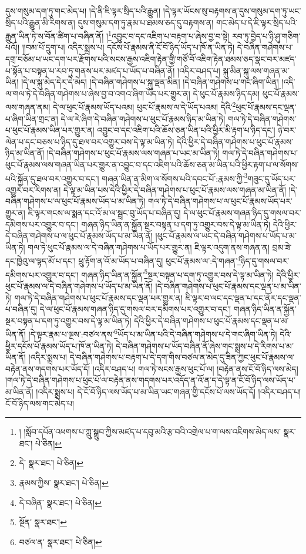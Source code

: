 དུས་གསུམ་དག་ཏུ་གང་མེད་པ། །དེ་ནི་ཇི་ལྟར་སྲིད་པའི་རྒྱུན། །དེ་ལྟར་ཡོངས་སུ་བརྟགས་ན་དུས་གསུམ་དག་ཏུ་ཡང་སྲིད་པའི་རྒྱུན་མི་རིགས་ན། དུས་གསུམ་དག་ཏུ་རྣམ་པ་ཐམས་ཅད་དུ་བརྟགས་ན། གང་མེད་པ་དེ་ཇི་ལྟར་སྲིད་པའི་རྒྱུན་ཡིན་ཏེ་ས་བོན་ཚིག་པ་བཞིན་ནོ། །\footnote{། །སློབ་དཔོན་འཕགས་པ་ཀླུ་སྒྲུབ་ཀྱིས་མཛད་པ་དབུ་མའི་རྩ་བའི་འགྲེལ་པ་ག་ལས་འཇིགས་མེད་ལས་  སྣར་ཐང་།  པེ་ཅིན། }འབྱུང་བ་དང་འཇིག་པ་བརྟག་པ་ཞེས་བྱ་བ་སྟེ། རབ་ཏུ་བྱེད་པ་ཉི་ཤུ་གཅིག་པའོ།། །།བམ་པོ་དྲུག་པ། འདིར་སྨྲས་པ། དངོས་པོ་རྣམས་ནི་ངོ་བོ་ཉིད་ཡོད་པ་ཁོ་ན་ཡིན་ཏེ། དེ་བཞིན་གཤེགས་པ་དགྲ་བཅོམ་པ་ཡང་དག་པར་རྫོགས་པའི་སངས་རྒྱས་འཇིག་རྟེན་གྱི་གཙོ་བོ་འཇིག་རྟེན་ཐམས་ཅད་སྣང་བར་མཛད་པ་སྟོན་པ་བསྟན་པ་རབ་ཏུ་གནས་པར་མཛད་པ་ཡོད་པ་བཞིན་ནོ། །འདིར་བཤད་པ། སྐུ་མིན་སྐུ་ལས་གཞན་མ་ཡིན། །དེ་ལ་སྐུ་མེད་དེར་དེ་མེད། །དེ་བཞིན་གཤེགས་པ་སྐུ་ལྡན་མིན། །དེ་བཞིན་གཤེགས་པ་གང་ཞིག་ཡིན། །འདི་ལ་གལ་ཏེ་དེ་བཞིན་གཤེགས་པ་ཞེས་བྱ་བ་འགའ་ཞིག་ཡོད་པར་གྱུར་ན། དེ་ཕུང་པོ་རྣམས་ཉིད་དམ། ཕུང་པོ་རྣམས་ལས་གཞན་ནམ། དེ་ལ་ཕུང་པོ་རྣམས་ཡོད་པའམ། ཕུང་པོ་རྣམས་ལ་དེ་ཡོད་པའམ། དེའི་\footnote{དེ་  སྣར་ཐང་།  པེ་ཅིན། }ཕུང་པོ་རྣམས་དང་ལྡན་པ་ཞིག་ཡིན་གྲང་ན། དེ་ལ་རེ་ཞིག་དེ་བཞིན་གཤེགས་པ་ཕུང་པོ་རྣམས་ཉིད་མ་ཡིན་ཏེ། གལ་ཏེ་དེ་བཞིན་གཤེགས་པ་ཕུང་པོ་རྣམས་ཡིན་པར་གྱུར་ན། འབྱུང་བ་དང་འཇིག་པའི་ཆོས་ཅན་ཡིན་པའི་ཕྱིར་མི་རྟག་པ་ཉིད་དང་། ཉེ་བར་ལེན་པ་དང་བཅས་པ་ཉིད་དུ་ཐལ་བར་འགྱུར་བས་དེ་ལྟ་མ་ཡིན་ཏེ། དེའི་ཕྱིར་དེ་བཞིན་གཤེགས་པ་ཕུང་པོ་རྣམས་ཉིད་མ་ཡིན་ནོ། །དེ་བཞིན་གཤེགས་པ་ཕུང་པོ་རྣམས་ལས་གཞན་པ་ཡང་མ་ཡིན་ཏེ། གལ་ཏེ་དེ་བཞིན་གཤེགས་པ་ཕུང་པོ་རྣམས་ལས་གཞན་ཡིན་པར་གྱུར་ན་འབྱུང་བ་དང་འཇིག་པའི་ཆོས་ཅན་མ་ཡིན་པའི་ཕྱིར་རྟག་པ་ལ་སོགས་པའི་སྐྱོན་དུ་ཐལ་བར་འགྱུར་བ་དང་། གཞན་ཡིན་ན་མིག་ལ་སོགས་པའི་དབང་པོ་:རྣམས་ཀྱི་\footnote{རྣམས་ཀྱིས་  སྣར་ཐང་།  པེ་ཅིན། }གཟུང་དུ་ཡོད་པར་འགྱུར་བར་རིགས་ན། དེ་ལྟ་མ་ཡིན་པས་དེའི་ཕྱིར་དེ་བཞིན་གཤེགས་པ་ཕུང་པོ་རྣམས་ལས་གཞན་མ་ཡིན་ནོ། །དེ་བཞིན་གཤེགས་པ་ལ་ཕུང་པོ་རྣམས་ཡོད་པ་མ་ཡིན་ཏེ། གལ་ཏེ་དེ་བཞིན་གཤེགས་པ་ལ་ཕུང་པོ་རྣམས་ཡོད་པར་གྱུར་ན། ཇི་ལྟར་གངས་ལ་སྨན་དང་འོ་མ་ལ་སྦྲང་བུ་ཡོད་པ་བཞིན་དུ། དེ་ལ་ཕུང་པོ་རྣམས་གཞན་ཉིད་དུ་གསལ་བར་དམིགས་པར་འགྱུར་བ་དང་། གཞན་ཉིད་ཡིན་ན་སྐྱོན་སྔར་བསྟན་པ་དག་ཏུ་འགྱུར་བས་དེ་ལྟ་མ་ཡིན་ཏེ། དེའི་ཕྱིར་དེ་བཞིན་གཤེགས་པ་ལ་ཕུང་པོ་རྣམས་ཡོད་པ་མ་ཡིན་ནོ། །ཕུང་པོ་རྣམས་ལ་ཡང་དེ་བཞིན་གཤེགས་པ་ཡོད་པ་མ་ཡིན་ཏེ། གལ་ཏེ་ཕུང་པོ་རྣམས་ལ་དེ་བཞིན་གཤེགས་པ་ཡོད་པར་གྱུར་ན། ཇི་ལྟར་འདུག་ནས་གཞན་ན། བྲམ་ཟེ་དང་ཁྱེའུ་ལ་ལྟད་མོ་པ་དང་། ཕྲུ་རྟོག་ན་འོ་མ་ཡོད་པ་བཞིན་དུ། ཕུང་པོ་རྣམས་ལ་:དེ་གཞན་\footnote{དེ་བཞིན་  སྣར་ཐང་།  པེ་ཅིན། }ཉིད་དུ་གསལ་བར་དམིགས་པར་འགྱུར་བ་དང་། གཞན་ཉིད་ཡིན་ན་སྐྱོན་\footnote{སྔོན་  སྣར་ཐང་། }སྔར་བསྟན་པ་དག་ཏུ་འགྱུར་བས་དེ་ལྟ་མ་ཡིན་ཏེ། དེའི་ཕྱིར་ཕུང་པོ་རྣམས་ལ་དེ་བཞིན་གཤེགས་པ་ཡོད་པ་མ་ཡིན་ནོ། །དེ་བཞིན་གཤེགས་པ་ཕུང་པོ་རྣམས་དང་ལྡན་པ་མ་ཡིན་ཏེ། གལ་ཏེ་དེ་བཞིན་གཤེགས་པ་ཕུང་པོ་རྣམས་དང་ལྡན་པར་གྱུར་ན། ཇི་ལྟར་བ་ལང་དང་ལྡན་པ་དང་ནོར་དང་ལྡན་པ་བཞིན་དུ། དེ་ལ་ཕུང་པོ་རྣམས་གཞན་ཉིད་དུ་གསལ་བར་དམིགས་པར་འགྱུར་བ་དང་། གཞན་ཉིད་ཡིན་ན་སྐྱོན་སྔར་བསྟན་པ་དག་ཏུ་འགྱུར་བས་དེ་ལྟ་མ་ཡིན་ཏེ། དེའི་ཕྱིར་དེ་བཞིན་གཤེགས་པ་ཕུང་པོ་རྣམས་དང་ལྡན་པ་མ་ཡིན་ནོ། །དེ་ལྟར་རྣམ་པ་ལྔས་:བཙལ་ནས་\footnote{བཙལ་ན་  སྣར་ཐང་།  པེ་ཅིན། }ཡོད་པ་མ་ཡིན་པའི་དེ་བཞིན་གཤེགས་པ་དེ་གང་ཞིག་ཡིན་ཏེ། དེའི་ཕྱིར་དངོས་པོ་རྣམས་ཡོད་པ་ཁོ་ན་ཡིན་ཏེ། དེ་བཞིན་གཤེགས་པ་ཡོད་བཞིན་ནོ་ཞེས་གང་སྨྲས་པ་དེ་རིགས་པ་མ་ཡིན་ནོ། །འདིར་སྨྲས་པ། དེ་བཞིན་གཤེགས་པ་བརྟག་པ་དེ་དག་གིས་བཙལ་ན་མེད་དུ་ཟིན་ཀྱང་ཕུང་པོ་རྣམས་ལ་བརྟེན་ནས་གདགས་པར་ཡོད་དོ། །འདིར་བཤད་པ། གལ་ཏེ་སངས་རྒྱས་ཕུང་པོ་ལ། །བརྟེན་ནས་ངོ་བོ་ཉིད་ལས་མེད། །གལ་ཏེ་དེ་བཞིན་གཤེགས་པ་ཕུང་པོ་ལ་བརྟེན་ནས་གདགས་པར་འདོད་ན་འོ་ན་ད་དེ་ལྟ་ན་ངོ་བོ་ཉིད་ལས་ཡོད་པ་མ་ཡིན་ནོ། །འདིར་སྨྲས་པ། དེ་ངོ་བོ་ཉིད་ལས་ཡོད་པ་མ་ཡིན་ཡང་གཞན་གྱི་དངོས་པོ་ལས་ཡོད་དོ། །འདིར་བཤད་པ། ངོ་བོ་ཉིད་ལས་གང་མེད་པ། 
